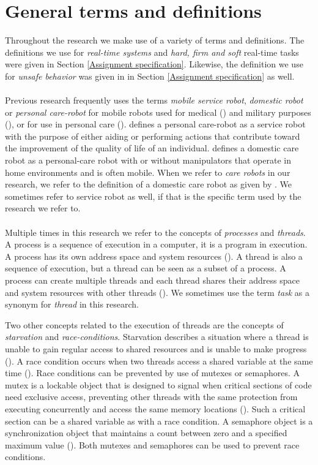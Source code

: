 \documentclass[12pt]{scrreprt}
\begin{document}
\section{General terms and definitions}
\label{Terms and defintions}
Throughout the research we make use of a variety of terms and definitions. The definitions we use for \textit{real-time systems} and \textit{hard, firm and soft} real-time tasks were given in Section \ref{Assignment specification}. Likewise, the definition we use for \textit{unsafe behavior} was given in in Section \ref{Assignment specification} as well.%
\\\\
Previous research frequently uses the terms \textit{mobile service robot}, \textit{domestic robot} or \textit{personal care-robot} for mobile robots used for medical (\cite{medical}) and military purposes (\cite{military}), or for use in personal care (\cite{personal}). \cite{tadele} defines a personal care-robot as a service robot with the purpose of either aiding or performing actions that contribute toward the improvement of the quality of life of an individual. \cite{tadele} defines a domestic care robot as a personal-care robot with or without manipulators that operate in home environments and is often mobile. When we refer to \textit{care robots} in our research, we refer to the definition of a domestic care robot as given by \citeauthor{tadele}. We sometimes refer to service robot as well, if that is the specific term used by the research we refer to.
\\\\
Multiple times in this research we refer to the concepts of \textit{processes} and \textit{threads}. A process is a sequence of execution in a computer, it is a program in execution. A process has its own address space and system resources (\cite{process_threads}). A thread is also a sequence of execution, but a thread can be seen as a subset of a process. A process can create multiple threads and each thread shares their address space and system resources with other threads (\cite{process_threads}). We sometimes use the term \textit{task} as a synonym for \textit{thread} in this research.
\par
Two other concepts related to the execution of threads are the concepts of \textit{starvation} and \textit{race-conditions}. Starvation describes a situation where a thread is unable to gain regular access to shared resources and is unable to make progress (\cite{livelock_starvation}). A race condition occurs when two threads access a shared variable at the same time (\cite{race_condition}). Race conditions can be prevented by use of mutexes or semaphores. A mutex is a lockable object that is designed to signal when critical sections of code need exclusive access, preventing other threads with the same protection from executing concurrently and access the same memory locations (\cite{mutex}). Such a critical section can be a shared variable as with a race condition. A semaphore object is a synchronization object that maintains a count between zero and a specified maximum value (\cite{semaphore}). Both mutexes and semaphores can be used to prevent race conditions.
\end{document}
